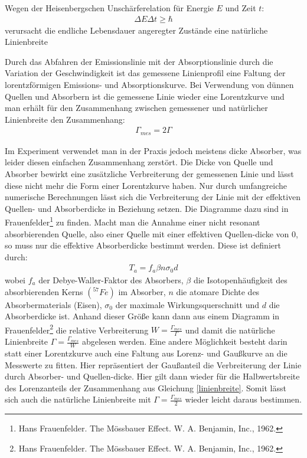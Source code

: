 \documentclass[12pt]{article}
\begin{document}
Wegen der Heisenbergschen Unschärferelation für Energie $E$ und Zeit $t$:
\begin{align}
 \Delta E \Delta t \geq \hbar
\end{align}
verursacht die endliche Lebensdauer angeregter Zustände eine natürliche Linienbreite

Durch das Abfahren der Emissionslinie mit der Absorptionslinie durch die Variation der Geschwindigkeit ist das gemessene Linienprofil eine Faltung der lorentzförmigen
Emissions- und Absorptionskurve. Bei Verwendung von dünnen Quellen und Absorbern ist die gemessene Linie wieder eine Lorentzkurve und man erhält für den Zusammenhang
zwischen gemessener und natürlicher Linienbreite den Zusammenhang:
\begin{align}
 \label{linienbreite}
 \Gamma_{mes} = 2\Gamma
\end{align}

Im Experiment verwendet man in der Praxis jedoch meistens dicke Absorber, was leider diesen einfachen Zusammenhang zerstört. Die Dicke von Quelle und Absorber bewirkt
eine zusätzliche Verbreiterung der gemessenen Linie und lässt diese nicht mehr die Form einer Lorentzkurve haben. Nur durch umfangreiche numerische Berechnungen
lässt sich die Verbreiterung der Linie mit der effektiven Quellen- und Absorberdicke in Beziehung setzen. Die Diagramme dazu sind in Frauenfelder\footnote{Hans Frauenfelder. The Mössbauer Effect. W. A. Benjamin, Inc., 1962.} zu finden.
Macht man die Annahme einer nicht resonant absorbierenden Quelle, also einer Quelle mit einer effektiven Quellen-dicke von 0, so muss nur die effektive Absorberdicke bestimmt
werden. Diese ist definiert durch:
\begin{align}
 T_a = f_a \beta n \sigma_0 d
\end{align}
wobei $f_a$ der Debye-Waller-Faktor des Absorbers, $\beta$ die Isotopenhäufigkeit des absorbierenden Kerns $(^{57}Fe)$ im Absorber, $n$ die atomare Dichte
des Absorbermaterials (Eisen), $\sigma_0$ der maximale Wirkungsquerschnitt und $d$ die Absorberdicke ist. Anhand dieser Größe kann dann aus einem Diagramm in Frauenfelder\footnote{Hans Frauenfelder. The Mössbauer Effect. W. A. Benjamin, Inc., 1962.}
die relative Verbreiterung $W = \frac{\Gamma_{mes}}{\Gamma}$ und damit die natürliche Linienbreite $\Gamma = \frac{\Gamma_{mes}}{W}$ abgelesen werden.
Eine andere Möglichkeit besteht darin statt einer Lorentzkurve auch eine Faltung aus Lorenz- und Gaußkurve an die Messwerte zu fitten. Hier repräsentiert der Gaußanteil
die Verbreiterung der Linie durch Absorber- und Quellen-dicke. Hier gilt dann wieder für die Halbwertsbreite des Lorenzanteils der Zusammenhang aus Gleichung \ref{linienbreite}.
Somit lässt sich auch die natürliche Linienbreite mit $\Gamma = \frac{\Gamma_{mes}}{2}$ wieder leicht daraus bestimmen.
\end{document}
